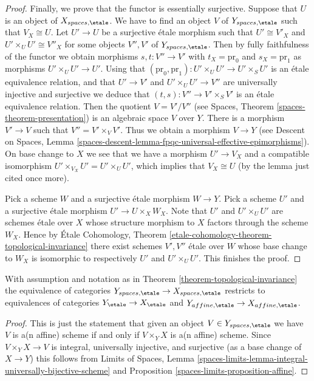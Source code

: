 \begin{proof}
\medskip\noindent
Finally, we prove that the functor is essentially surjective.
Suppose that $U$ is an object of $X_{spaces, \etale}$.
We have to find an object $V$ of $Y_{spaces, \etale}$
such that $V_X \cong U$. Let $U' \to U$ be a surjective \'etale morphism
such that $U' \cong V'_X$ and $U' \times_U U' \cong V''_X$
for some objects $V'', V'$ of $Y_{spaces, \etale}$.
Then by fully faithfulness of the functor we obtain morphisms
$s, t : V'' \to V'$ with $t_X = \text{pr}_0$ and $s_X = \text{pr}_1$
as morphisms $U' \times_U U' \to U'$. Using that
$(\text{pr}_0, \text{pr}_1) : U' \times_U U' \to U' \times_S U'$
is an \'etale equivalence relation, and that $U' \to V'$ and
$U' \times_U U' \to V''$ are universally injective and surjective
we deduce that
$(t, s) : V'' \to V' \times_S V'$ is an \'etale equivalence relation.
Then the quotient $V = V'/V''$ (see
Spaces, Theorem \ref{spaces-theorem-presentation})
is an algebraic space $V$ over $Y$. There is a morphism
$V' \to V$ such that $V'' = V' \times_V V'$. Thus we obtain a morphism
$V \to Y$ (see
Descent on Spaces, Lemma
\ref{spaces-descent-lemma-fpqc-universal-effective-epimorphisms}).
On base change to $X$ we see that we have a morphism $U' \to V_X$
and a compatible isomorphism $U' \times_{V_X} U' = U' \times_U U'$, which
implies that $V_X \cong U$ (by the lemma just cited once more).

\medskip\noindent
Pick a scheme $W$ and a surjective \'etale morphism $W \to Y$.
Pick a scheme $U'$ and a surjective \'etale morphism $U' \to U \times_X W_X$.
Note that $U'$ and $U' \times_U U'$ are schemes \'etale over $X$ whose
structure morphism to $X$ factors through the scheme $W_X$.
Hence by
\'Etale Cohomology,
Theorem \ref{etale-cohomology-theorem-topological-invariance}
there exist schemes $V', V''$ \'etale over $W$ whose base change to
$W_X$ is isomorphic to respectively $U'$ and $U' \times_U U'$.
This finishes the proof.
\end{proof}

\begin{lemma}
\label{lemma-topological-invariance}
With assumption and notation as in
Theorem \ref{theorem-topological-invariance}
the equivalence of categories
$Y_{spaces, \etale} \to X_{spaces, \etale}$
restricts to equivalences of categories
$Y_\etale \to X_\etale$ and $Y_{affine, \etale} \to X_{affine, \etale}$.
\end{lemma}

\begin{proof}
This is just the statement that given an object
$V \in Y_{spaces, \etale}$ we have $V$ is a(n affine) scheme if and
only if $V \times_Y X$ is a(n affine) scheme. Since $V \times_Y X \to V$
is integral, universally injective, and surjective (as a base
change of $X \to Y$) this
follows from Limits of Spaces, Lemma
\ref{spaces-limits-lemma-integral-universally-bijective-scheme} and
Proposition \ref{spaces-limits-proposition-affine}.
\end{proof}

